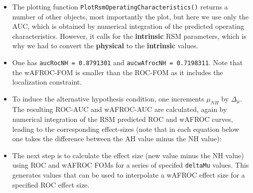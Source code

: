 \documentclass[]{book}
\begin{document}
\begin{itemize}
\item
  The plotting function \texttt{PlotRsmOperatingCharacteristics()} returns a number of other objects, most importantly the plot, but here we use only the AUC, which is obtained by numerical integration of the predicted operating characteristics. However, it calls for the \textbf{intrinsic} RSM parameters, which is why we had to convert the \textbf{physical} to the \textbf{intrinsic} values.
\item
  One has \texttt{aucRocNH\ =\ 0.8791301} and \texttt{aucwAfrocNH\ =\ 0.7198311}. Note that the wAFROC-FOM is smaller than the ROC-FOM as it includes the localization constraint.
\item
  To induce the alternative hypothesis condition, one increments \(\mu_{NH}\) by \(\Delta_{\mu}\). The resulting ROC-AUC and wAFROC-AUC are calculated, again by numerical integration of the RSM predicted ROC and wAFROC curves, leading to the corresponding effect-sizes (note that in each equation below one takes the difference between the AH value minus the NH value):
\item
  The next step is to calculate the effect size (new value minus the NH value) using ROC and wAFROC FOMs for a series of specifed \texttt{deltaMu} values. This generates values that can be used to interpolate a wAFROC effect size for a specified ROC effect size.
\end{itemize}
\end{document}
